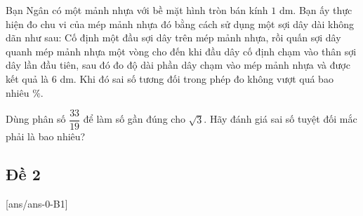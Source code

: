 \begin{ex}%
	Bạn Ngân có một mảnh nhựa với bề mặt hình tròn bán kính $1$ dm. Bạn ấy thực hiện đo chu vi của mép mảnh nhựa đó bằng cách sử dụng một sợi dây dài không dãn như sau: Cố định một đầu sợi dây trên mép mảnh nhựa, rồi quấn sợi dây quanh mép mảnh nhựa một vòng cho đến khi đầu dây cố định chạm vào thân sợi dây lần đầu tiên, sau đó đo độ dài phần dây chạm vào mép mảnh nhựa và được kết quả là $6$ dm. Khi đó sai số tương đối trong phép đo không vượt quá bao nhiêu $\%$.
\end{ex}
\begin{ex}%
	Dùng phân số $\dfrac{33}{19}$ để làm số gần đúng cho $\sqrt{3}$. Hãy đánh giá sai số tuyệt đối mắc phải là bao nhiêu?
\end{ex}
\newpage 
\subsection{Đề 2}
[ans/ans-0-B1]
\caulc

